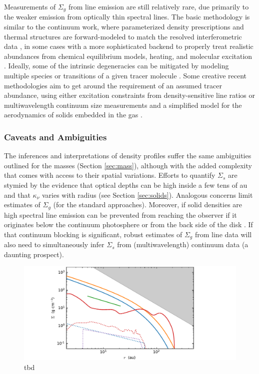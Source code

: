 \documentclass[a4paper]{ar-1col}
\begin{document}
Measurements of $\Sigma_g$ from line emission are still relatively rare, due primarily to the weaker emission from optically thin spectral lines.  The basic methodology is similar to the continuum work, where parameterized density prescriptions and thermal structures are forward-modeled to match the resolved interferometric data \citep[e.g.,][]{guilloteau98,isella07,qi08,qi11,rosenfeld13b,williams16}, in some cases with a more sophisticated backend to properly treat realistic abundances from chemical equilibrium models, heating, and molecular excitation \citep[e.g.,][]{woitke09,bruderer14,miotello18}.  Ideally, some of the intrinsic degeneracies can be mitigated by modeling multiple species or transitions of a given tracer molecule \citep[e.g.,][]{dartois03,schwarz16,zhang17,cleeves17}.  Some creative recent methodologies aim to get around the requirement of an assumed tracer abundance, using either excitation constraints from density-sensitive line ratios \citep[e.g.,][]{dutrey17} or multiwavelength continuum size measurements and a simplified model for the aerodynamics of solids embedded in the gas \citep{powell17,powell19}.       


\subsubsection{Caveats and Ambiguities}
The inferences and interpretations of density profiles suffer the same ambiguities outlined for the masses (Section \ref{sec:mass}), although with the added complexity that comes with access to their spatial variations.  Efforts to quantify $\Sigma_s$ are stymied by the evidence that optical depths can be high inside a few tens of au and that $\kappa_\nu$ varies with radius (see Section \ref{sec:solids}).  Analogous concerns limit estimates of $\Sigma_g$ (for the standard approaches).  Moreover, if solid densities are high spectral line emission can be prevented from reaching the observer if it originates below the continuum photosphere or from the back side of the disk \citep[e.g.,][]{weaver18,isella18}.  If that continuum blocking is significant, robust estimates of $\Sigma_g$ from line data will also need to simultaneously infer $\Sigma_s$ from (multiwavelength) continuum data (a daunting prospect).  

\begin{figure}[t]
\includegraphics[width=\textwidth]{tw_sigma.pdf}
\caption{tbd}
\label{fig:tw_sigmas}
\end{figure}
\end{document}
